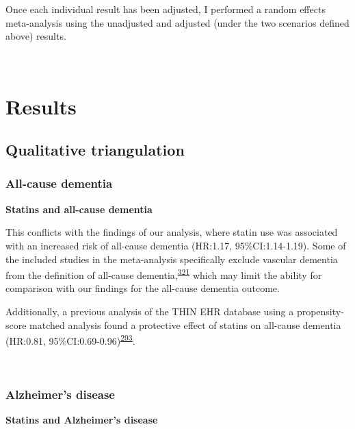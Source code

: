 \documentclass[a4paper, twoside]{templates/ociamthesis}
\begin{document}
Once each individual result has been adjusted, I performed a random effects meta-analysis using the unadjusted and adjusted (under the two scenarios defined above) results.

~

\hypertarget{results-3}{%
\section{Results}\label{results-3}}

\hypertarget{qualitative-triangulation-1}{%
\subsection{Qualitative triangulation}\label{qualitative-triangulation-1}}

\hypertarget{all-cause-dementia}{%
\subsubsection{All-cause dementia}\label{all-cause-dementia}}

\textbf{Statins and all-cause dementia}

This conflicts with the findings of our analysis, where statin use was associated with an increased risk of all-cause dementia (HR:1.17, 95\%CI:1.14-1.19). Some of the included studies in the meta-analysis specifically exclude vascular dementia from the definition of all-cause dementia,\textsuperscript{\protect\hyperlink{ref-chao2015}{321}} which may limit the ability for comparison with our findings for the all-cause dementia outcome.

Additionally, a previous analysis of the THIN EHR database using a propensity-score matched analysis found a protective effect of statins on all-cause dementia (HR:0.81, 95\%CI:0.69-0.96)\textsuperscript{\protect\hyperlink{ref-smeeth2009}{293}}.

~

\hypertarget{alzheimers-disease}{%
\subsubsection{Alzheimer's disease}\label{alzheimers-disease}}

\textbf{Statins and Alzheimer's disease}
\end{document}
